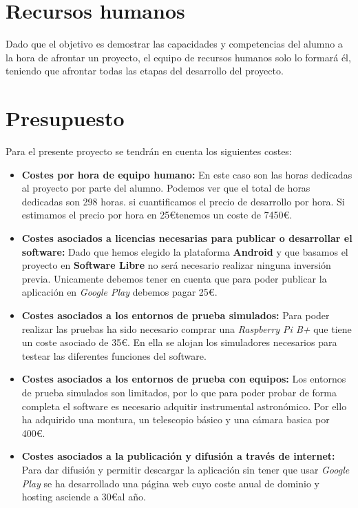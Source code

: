 \section{Recursos humanos}

Dado que el objetivo es demostrar las capacidades y competencias del alumno a la hora de afrontar un proyecto, el equipo de recursos humanos solo lo formará él, teniendo que afrontar todas las etapas del desarrollo del proyecto.
\newpage
\section{Presupuesto}

Para el presente proyecto se tendrán en cuenta los siguientes costes:

\begin{itemize}
  \item \textbf{Costes por hora de equipo humano:} En este caso son las horas dedicadas al proyecto por parte del alumno. Podemos ver que el total de horas dedicadas son 298 horas. si cuantificamos el precio de desarrollo por hora. Si estimamos el precio por hora en 25\euro tenemos un coste de 7450\euro.
  \item \textbf{Costes asociados a licencias necesarias para publicar o desarrollar el software:} Dado que hemos elegido la plataforma \textbf{Android} y que basamos el proyecto en \textbf{Software Libre} no será necesario realizar ninguna inversión previa. Unicamente debemos tener en cuenta que para poder publicar la aplicación en \textit{Google Play} debemos pagar 25\euro.
  \item \textbf{Costes asociados a los entornos de prueba simulados:} Para poder realizar las pruebas ha sido necesario comprar una \textit{Raspberry Pi B+} que tiene un coste asociado de 35\euro. En ella se alojan los simuladores necesarios para testear las diferentes funciones del software.
  \item \textbf{Costes asociados a los entornos de prueba con equipos:} Los entornos de prueba simulados son limitados, por lo que para poder probar de forma completa el software es necesario adquitir instrumental astronómico. Por ello ha adquirido una montura, un telescopio básico y una cámara basica por 400\euro.
  \item \textbf{Costes asociados a la publicación y difusión a través de internet:} Para dar difusión y permitir descargar la aplicación sin tener que usar \textit{Google Play} se ha desarrollado una página web cuyo coste anual de dominio y hosting asciende a 30\euro al año.
\end{itemize}

